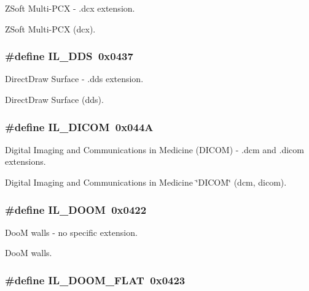Z\+Soft Multi-\/\+P\+C\+X -\/ .dcx extension. 

Z\+Soft Multi-\/\+P\+C\+X (dcx). \hypertarget{group__il__formats_ga737d76763f2c9fb7f25be40130434913}{
\subsubsection[{I\+L\+\_\+\+D\+D\+S}]{\setlength{\rightskip}{0pt plus 5cm}\#define I\+L\+\_\+\+D\+D\+S~0x0437}}\label{group__il__formats_ga737d76763f2c9fb7f25be40130434913}


Direct\+Draw Surface -\/ .dds extension. 

Direct\+Draw Surface (dds). \hypertarget{group__il__formats_gac99ded04fa7abc9b5394f99107076be0}{
\subsubsection[{I\+L\+\_\+\+D\+I\+C\+O\+M}]{\setlength{\rightskip}{0pt plus 5cm}\#define I\+L\+\_\+\+D\+I\+C\+O\+M~0x044\+A}}\label{group__il__formats_gac99ded04fa7abc9b5394f99107076be0}


Digital Imaging and Communications in Medicine (D\+I\+C\+O\+M) -\/ .dcm and .dicom extensions. 

Digital Imaging and Communications in Medicine \char`\"{}\+D\+I\+C\+O\+M\char`\"{} (dcm, dicom). \hypertarget{group__il__formats_gaf3b00e93d3cee92c183ee457c8ce8f2a}{
\subsubsection[{I\+L\+\_\+\+D\+O\+O\+M}]{\setlength{\rightskip}{0pt plus 5cm}\#define I\+L\+\_\+\+D\+O\+O\+M~0x0422}}\label{group__il__formats_gaf3b00e93d3cee92c183ee457c8ce8f2a}


Doo\+M walls -\/ no specific extension. 

Doo\+M walls. \hypertarget{group__il__formats_gad0b331e9c40485c339bd0e5698234d89}{
\subsubsection[{I\+L\+\_\+\+D\+O\+O\+M\+\_\+\+F\+L\+A\+T}]{\setlength{\rightskip}{0pt plus 5cm}\#define I\+L\+\_\+\+D\+O\+O\+M\+\_\+\+F\+L\+A\+T~0x0423}}\label{group__il__formats_gad0b331e9c40485c339bd0e5698234d89}


